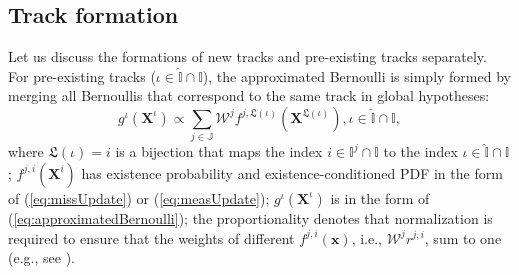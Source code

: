 \documentclass[journal]{IEEEtran}
\begin{document}
\subsection{Track formation}
Let us discuss the formations of new tracks and pre-existing tracks separately. For pre-existing tracks ($\iota\in\hat{\mathbb{I}}\cap\mathbb{I}$), the approximated Bernoulli is simply formed by merging all Bernoullis that correspond to the same track in global hypotheses:
\begin{equation}
    g^{\iota}(\mathbf{X}^{\iota}) \propto \sum_{j\in\mathbb{J}}\mathcal{W}^jf^{j,\mathfrak{L}(\iota)}(\mathbf{X}^{\mathfrak{L}(\iota)}), \iota\in\hat{\mathbb{I}}\cap\mathbb{I},
    \label{eq:tomerge}
\end{equation}
where $\mathfrak{L}(\iota)=i$ is a bijection that maps the index $i\in\mathbb{I}^j\cap\mathbb{I}$ to the index $\iota\in\hat{\mathbb{I}}\cap\mathbb{I}$; $f^{j,i}(\mathbf{X}^i)$ has existence probability and existence-conditioned PDF in the form of (\ref{eq:missUpdate}) or (\ref{eq:measUpdate}); $g^{\iota}(\mathbf{X}^{\iota})$ is in the form of (\ref{eq:approximatedBernoulli}); the proportionality denotes that normalization is required to ensure that the weights of different $f^{j,i}(\mathbf{x})$, i.e., $\mathcal{W}^jr^{j,i}$, sum to one (e.g., see \cite{ArdeshiriGOO:2015}).
\end{document}
